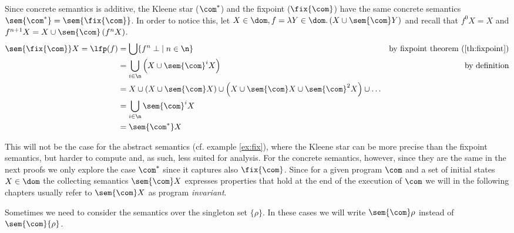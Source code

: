 Since concrete semantics is additive, the Kleene star (\(\com^*\)) and
the fixpoint (\(\fix{\com}\)) have the same concrete semantics
\(\sem{\com^*} = \sem{\fix{\com}}\). In order to notice this, let
\(X \in \dom, f = \lambda Y \in\dom . \left(X \cup
  \sem{\com}Y\right)\) and recall that \(f^0 X = X\) and 
\(f^{n+1} X = X \cup \sem{\com}\left(f^n X\right)\).
\begin{align*}
  \sem{\fix{\com}}X = \lfp(f) & = \bigcup \{ f^n \; \bot \mid n \in \n \} & \text{by fixpoint theorem (\ref{th:fixpoint})} \\
                              & = \bigcup_{i\in\n} \left( X \cup \sem{\com}^iX \right) & \text{by definition} \\
                              & = X \cup \left( X \cup \sem{\com}X \right) \cup \left( X \cup \sem{\com}X \cup \sem{\com}^2X \right) \cup \dots \\
                              & = \bigcup_{i\in\n} \sem{\com}^i X \\
                              & = \sem{\com^*}X
\end{align*}

This will not be the case for the abstract semantics (cf. example
\ref{ex:fix}), where the Kleene star can be more precise than the
fixpoint semantics, but harder to compute and, as such, less suited
for analysis. For the concrete semantics, however, since they are the
same in the next proofs we only explore the case \(\com^*\) since it
captures also \(\fix{\com}\). Since for a given program \(\com\) and a
set of initial states \(X \in \dom\) the collecting semantics
\(\sem{\com}X\) expresses properties that hold at the end of the
execution of \(\com\) we will in the following chapters usually refer
to \(\sem{\com}X\) as program \emph{invariant}.

\begin{notation}
  Sometimes we need to consider the semantics over the singleton set
  \(\{\rho\}\). In these cases we will write \(\sem{\com}\rho\)
  instead of \(\sem{\com}\{\rho\}\).
\end{notation}


